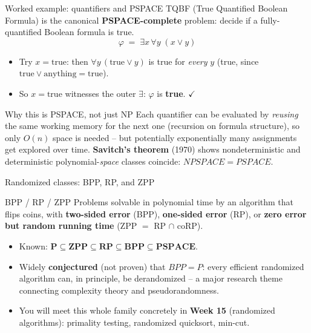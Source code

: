 \documentclass[11pt,aspectratio=169]{beamer}
\begin{document}
\begin{frame}{Worked example: quantifiers and PSPACE}
  \textsc{TQBF} (True Quantified Boolean Formula) is the canonical
  \textbf{PSPACE-complete} problem: decide if a fully-quantified Boolean formula is
  true.
  \[
    \varphi \;=\; \exists x\, \forall y \; (x \lor y)
  \]
  \begin{itemize}
    \item Try $x = \text{true}$: then $\forall y\,(\text{true} \lor y)$ is true for
    \emph{every} $y$ (true, since $\text{true} \lor \text{anything} = \text{true}$).
    \item So $x = \text{true}$ witnesses the outer $\exists$: $\varphi$ is
    \textbf{true}. $\checkmark$
  \end{itemize}
  \begin{exampleblock}{Why this is PSPACE, not just NP}
    Each quantifier can be evaluated by \emph{reusing} the same working memory for the
    next one (recursion on formula structure), so only $O(n)$ space is needed --
    but potentially exponentially many assignments get explored over time.
    \textbf{Savitch's theorem} (1970) shows nondeterministic and deterministic
    polynomial-\emph{space} classes coincide: $NPSPACE = PSPACE$.
  \end{exampleblock}
\end{frame}

\begin{frame}{Randomized classes: BPP, RP, and ZPP}
  \begin{block}{BPP / RP / ZPP}
    Problems solvable in polynomial time by an algorithm that flips coins, with
    \textbf{two-sided error} (BPP), \textbf{one-sided error} (RP), or \textbf{zero
    error but random running time} (ZPP $=$ RP $\cap$ coRP).
  \end{block}
  \begin{itemize}
    \item Known: $\mathbf{P \subseteq ZPP \subseteq RP \subseteq BPP \subseteq PSPACE}$.
    \item Widely \textbf{conjectured} (not proven) that $BPP = P$: every efficient
    randomized algorithm can, in principle, be derandomized -- a major research theme
    connecting complexity theory and pseudorandomness.
    \item You will meet this whole family concretely in \textbf{Week 15} (randomized
    algorithms): primality testing, randomized quicksort, min-cut.
  \end{itemize}
\end{frame}
\end{document}
